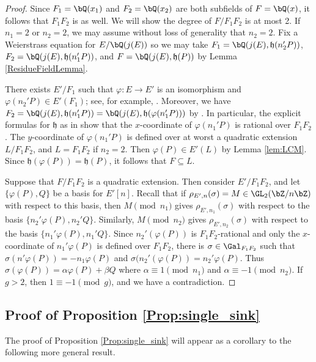 \documentclass[11pt,reqno]{amsart}
\theoremstyle{plain}
\theoremstyle{definition}
\newcommand{\Q}{\bQ}
\newcommand{\Z}{\bZ}
\begin{document}
\begin{proof}
Since $F_1=\Q(x_1)$ and $F_2=\Q(x_2)$ are both subfields of $F=\Q(x)$, it follows that $F_1F_2$ is as well. We will show the degree of $F/F_1F_2$ is at most 2. If $n_1=2$ or $n_2=2$, we may assume without loss of generality that $n_2=2$. Fix a Weierstrass equation for $E/\Q(j(E))$ so we may take $F_1=\Q(j(E),\mathfrak{h}(n_2'P))$, $F_2=\Q(j(E),\mathfrak{h}(n_1'P))$, and $F=\Q(j(E),\mathfrak{h}(P))$ by Lemma \ref{ResidueFieldLemma}. 

There exists $E'/F_1$ such that $\varphi:E \rightarrow E'$ is an isomorphism and $\varphi(n_2'P) \in E'(F_1)$; see, for example, \cite[p. 274, Proposition VI.3.2]{DR}. Moreover, we have $F_2= \Q(j(E),\mathfrak{h}(n_1'P))=\Q(j(E),\mathfrak{h}(\varphi(n_1'P)))$ by \cite[p. 107]{shimura}. In particular, the explicit formulas for $\mathfrak{h}$ as in \cite[p. 107]{shimura} show that the $x$-coordinate of $\varphi(n_1'P)$ is rational over $F_1F_2$. The $y$-coordinate of $\varphi(n_1'P)$ is defined over at worst a quadratic extension $L/F_1F_2$, and $L=F_1F_2$ if $n_2=2$. Then $\varphi(P) \in E'(L)$ by Lemma \ref{lem:LCM}. Since $\mathfrak{h}(\varphi(P))=\mathfrak{h}(P)$, it follows that $F \subseteq L$.

Suppose that $F/F_1F_2$ is a quadratic extension. Then consider $E'/F_1F_2$, and let $\{\varphi(P),Q\}$ be a basis for $E'[n]$. Recall that if $\rho_{E',n}(\sigma)=M \in \GL_2(\Z/n\Z)$ with respect to this basis, then $M \pmod{n_1}$ gives $\rho_{E',n_1}(\sigma)$ with respect to the basis $\{n_2'\varphi(P),n_2'Q\}$. Similarly, $M\pmod{n_2}$ gives $\rho_{E',n_2}(\sigma)$ with respect to the basis $\{n_1'\varphi(P),n_1'Q\}$.  Since $n_2'(\varphi(P))$ is $F_1F_2$-rational and only the $x$-coordinate of $n_1'\varphi(P)$ is defined over $F_1F_2$, there is $\sigma\in \Gal_{F_1F_2}$ such that $\sigma(n'\varphi(P))=-n_1\varphi(P)$ and $\sigma(n_2'(\varphi(P))=n_2'\varphi(P)$. Thus $\sigma(\varphi(P))=\alpha \varphi(P)+\beta Q$ where $\alpha \equiv 1 \pmod{n_1}$ and $\alpha \equiv -1 \pmod{n_2}$. If $g>2$, then $1 \equiv -1 \pmod{g}$, and we have a contradiction.
\end{proof}

\subsection{Proof of Proposition \ref{Prop:single_sink}}
The proof of Proposition \ref{Prop:single_sink} will appear as a corollary to the following more general result.
\end{document}
